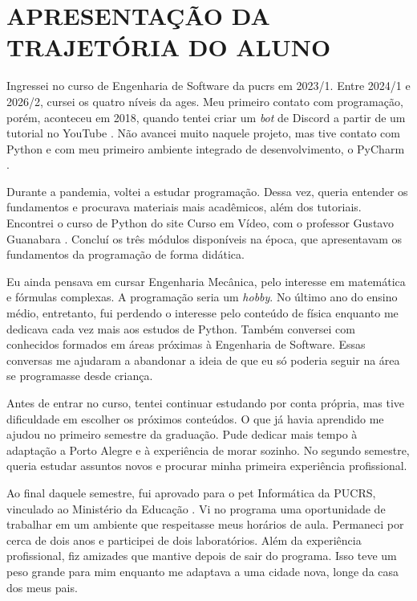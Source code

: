 \chapter[APRESENTAÇÃO DA TRAJETÓRIA DO ALUNO]{APRESENTAÇÃO DA TRAJETÓRIA DO ALUNO}

Ingressei no curso de Engenharia de Software da \ac{pucrs} em 2023/1.
Entre 2024/1 e 2026/2, cursei os quatro níveis da \ac{ages}. Meu primeiro
contato com programação, porém, aconteceu em 2018, quando tentei criar um
\textit{bot} de Discord \cite{discord-site} a partir de um tutorial no
YouTube \cite{youtube-site}. Não avancei muito naquele projeto, mas tive
contato com Python \cite{python-docs} e com meu primeiro ambiente integrado
de desenvolvimento, o PyCharm \cite{pycharm-site}.

Durante a pandemia, voltei a estudar programação. Dessa vez, queria entender
os fundamentos e procurava materiais mais acadêmicos, além dos tutoriais.
Encontrei o curso de Python do site Curso em Vídeo, com o professor Gustavo
Guanabara \cite{cursoemvideo-python}. Concluí os três módulos disponíveis
na época, que apresentavam os fundamentos da programação de forma didática.

Eu ainda pensava em cursar Engenharia Mecânica, pelo interesse em matemática
e fórmulas complexas. A programação seria um \textit{hobby}. No último ano
do ensino médio, entretanto, fui perdendo o interesse pelo conteúdo de
física enquanto me dedicava cada vez mais aos estudos de Python. Também
conversei com conhecidos formados em áreas próximas à Engenharia de
Software. Essas conversas me ajudaram a abandonar a ideia de que eu só
poderia seguir na área se programasse desde criança.

Antes de entrar no curso, tentei continuar estudando por conta própria,
mas tive dificuldade em escolher os próximos conteúdos. O que já havia
aprendido me ajudou no primeiro semestre da graduação. Pude dedicar mais
tempo à adaptação a Porto Alegre e à experiência de morar sozinho. No
segundo semestre, queria estudar assuntos novos e procurar minha primeira
experiência profissional.

Ao final daquele semestre, fui aprovado para o \ac{pet} Informática da
PUCRS, vinculado ao Ministério da Educação \cite{pet-mec}. Vi no programa
uma oportunidade de trabalhar em um ambiente que respeitasse meus horários
de aula. Permaneci por cerca de dois anos e participei de dois laboratórios.
Além da experiência profissional, fiz amizades que mantive depois de sair
do programa. Isso teve um peso grande para mim enquanto me adaptava a uma
cidade nova, longe da casa dos meus pais.

